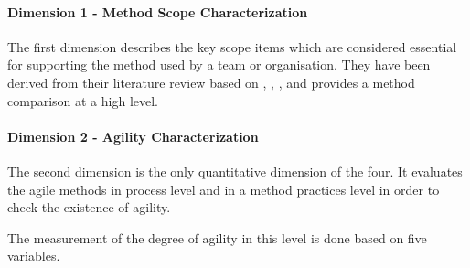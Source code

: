 \paragraph{Dimension 1 - Method Scope Characterization}
The first dimension describes the key scope items which are considered essential for supporting the method used by a team or organisation. They have been derived from their literature review based on \citet{Beck:2004:EPE:1076267}, \citet{koch2005agile}, \citet{Palmer:2001:PGF:600044}, \citet{Highsmith:2000:ASD:323922} and provides a method comparison at a high level.


%

\paragraph{Dimension 2 - Agility Characterization}
The second dimension is the only quantitative dimension of the four. It evaluates the agile methods in process level and in a method practices level in order to check the existence of agility.

The measurement of the degree of agility in this level is done based on five variables. %

